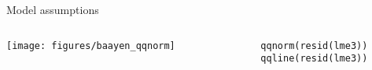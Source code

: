 \documentclass{beamer}
\begin{document}
\begin{frame}[fragile]{Model assumptions}
  \begin{columns}
    \begin{column}{6cm}
      \texttt{[image: figures/baayen\_qqnorm]}
    \end{column}
    \begin{column}{4cm}
      \begin{lstlisting}
      qqnorm(resid(lme3))
      qqline(resid(lme3))
      \end{lstlisting}
    \end{column}
  \end{columns}
\end{frame}



% 
% 
\end{document}
